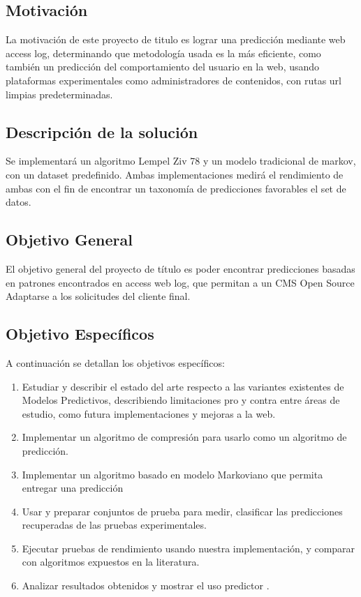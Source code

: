 \documentclass{udparticle}
\begin{document}
 




\subsection{Motivación}

La motivación de este proyecto de titulo es lograr una predicción mediante web access log, determinando que metodología usada es la más eficiente,
como también un predicción del comportamiento del usuario en la web, 
usando plataformas experimentales como administradores de contenidos, con rutas url limpias predeterminadas.
 
 
\subsection{Descripción de la solución }
 
 Se implementará un algoritmo Lempel Ziv 78 y un modelo tradicional de markov, con un dataset predefinido.
 Ambas implementaciones medirá el rendimiento de ambas con el fin de encontrar un taxonomía de predicciones favorables
 el set de datos.
 


 
\subsection{Objetivo General}
 
 El objetivo general del proyecto de título es poder encontrar predicciones basadas en patrones encontrados en access web log, que permitan
 a un CMS Open Source Adaptarse a los solicitudes del cliente final.
 
\subsection{Objetivo  Específicos }
 
 A continuación se detallan los objetivos específicos:
 
\begin{enumerate}
	\item Estudiar y describir el estado del arte respecto a las variantes existentes de Modelos Predictivos, describiendo limitaciones pro y contra entre áreas de estudio, como futura implementaciones y mejoras a la web.
	\item Implementar un algoritmo de compresión para usarlo como un algoritmo de predicción.
	\item Implementar un algoritmo basado en modelo Markoviano que permita entregar una predicción
	\item Usar y preparar conjuntos de prueba para medir, clasificar las predicciones recuperadas de las pruebas experimentales.
	\item Ejecutar pruebas de rendimiento usando nuestra implementación, y comparar con algoritmos expuestos en la literatura.
	\item Analizar resultados obtenidos y mostrar el uso predictor .

\end{enumerate}
\end{document}

